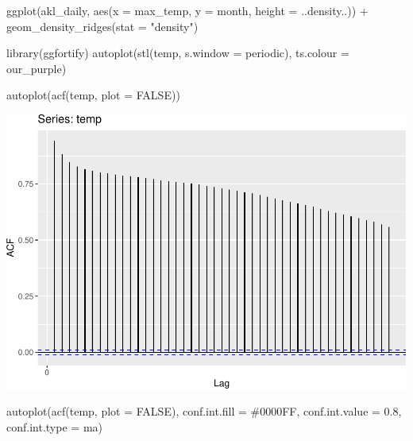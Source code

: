 \documentclass[
  paper=a4,
  ,captions=tableheading
]{scrartcl}
\newenvironment{Shaded}{\begin{snugshade}}{\end{snugshade}}
\newcommand{\AttributeTok}[1]{\textcolor[rgb]{0.77,0.63,0.00}{#1}}
\newcommand{\ConstantTok}[1]{\textcolor[rgb]{0.00,0.00,0.00}{#1}}
\newcommand{\FloatTok}[1]{\textcolor[rgb]{0.00,0.00,0.81}{#1}}
\newcommand{\FunctionTok}[1]{\textcolor[rgb]{0.00,0.00,0.00}{#1}}
\newcommand{\NormalTok}[1]{#1}
\newcommand{\SpecialCharTok}[1]{\textcolor[rgb]{0.00,0.00,0.00}{#1}}
\newcommand{\StringTok}[1]{\textcolor[rgb]{0.31,0.60,0.02}{#1}}
\begin{document}
\begin{Shaded}
\begin{Highlighting}[]
\FunctionTok{ggplot}\NormalTok{(akl\_daily, }\FunctionTok{aes}\NormalTok{(}\AttributeTok{x =}\NormalTok{ max\_temp, }\AttributeTok{y =}\NormalTok{ month, }\AttributeTok{height =}\NormalTok{ ..density..)) }\SpecialCharTok{+}
  \FunctionTok{geom\_density\_ridges}\NormalTok{(}\AttributeTok{stat =} \StringTok{"density"}\NormalTok{)}
\end{Highlighting}
\end{Shaded}

\begin{Shaded}
\begin{Highlighting}[]
\FunctionTok{library}\NormalTok{(ggfortify)}
\FunctionTok{autoplot}\NormalTok{(}\FunctionTok{stl}\NormalTok{(temp, }\AttributeTok{s.window =} \StringTok{\textquotesingle{}periodic\textquotesingle{}}\NormalTok{), }\AttributeTok{ts.colour =}\NormalTok{ our\_purple)}
\end{Highlighting}
\end{Shaded}

\begin{Shaded}
\begin{Highlighting}[]
\FunctionTok{autoplot}\NormalTok{(}\FunctionTok{acf}\NormalTok{(temp, }\AttributeTok{plot =} \ConstantTok{FALSE}\NormalTok{))}
\end{Highlighting}
\end{Shaded}

\includegraphics{Haskell_files/figure-latex/unnamed-chunk-61-1.pdf}

\begin{Shaded}
\begin{Highlighting}[]
\FunctionTok{autoplot}\NormalTok{(}\FunctionTok{acf}\NormalTok{(temp, }\AttributeTok{plot =} \ConstantTok{FALSE}\NormalTok{), }\AttributeTok{conf.int.fill =} \StringTok{\textquotesingle{}\#0000FF\textquotesingle{}}\NormalTok{, }\AttributeTok{conf.int.value =} \FloatTok{0.8}\NormalTok{, }\AttributeTok{conf.int.type =} \StringTok{\textquotesingle{}ma\textquotesingle{}}\NormalTok{)}
\end{Highlighting}
\end{Shaded}
\end{document}
